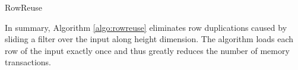\begin{algorithm}
	\caption{RowReuse}
	\label{algo:rowreuse}
\end{algorithm}

In summary, Algorithm \ref{algo:rowreuse} eliminates row duplications caused by sliding a filter over the input along height dimension. The
algorithm loads each row of the input exactly once and thus greatly reduces the number of memory transactions.
